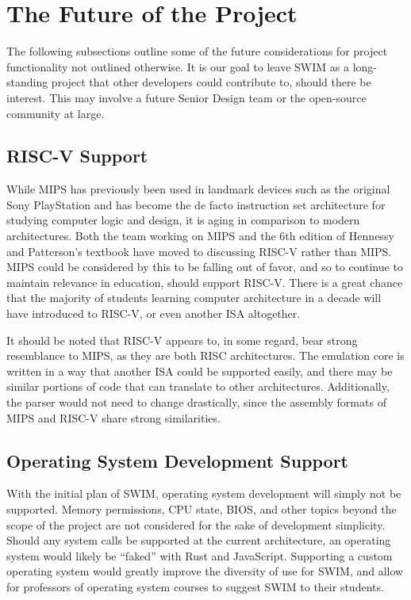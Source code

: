 \documentclass[
    paper=letter,
    parskip=half,
    fontsize=12pt,
    titlepage=firstiscover,
    toc=bibliography,
    numbers=endperiod
]{scrartcl}
\let\oldsection\section
\renewcommand{\section}{\newpage\oldsection}
\begin{document}
\section{The Future of the Project}

The following subsections outline some of the future considerations for
project functionality not outlined otherwise. It is our goal to leave
SWIM as a long-standing project that other developers could contribute
to, should there be interest. This may involve a future Senior Design
team or the open-source community at large.

\subsection{RISC-V Support}

While MIPS has previously been used in landmark devices such as the
original Sony PlayStation and has become the de facto instruction set
architecture for studying computer logic and design, it is aging in
comparison to modern architectures. Both the team working on MIPS and
the 6th edition of Hennessy and Patterson's textbook have moved to
discussing RISC-V rather than MIPS. MIPS could be considered by this to
be falling out of favor, and so to continue to maintain relevance in
education, should support RISC-V. There is a great chance that the
majority of students learning computer architecture in a decade will have
introduced to RISC-V, or even another ISA altogether.

It should be noted that RISC-V appears to, in some regard, bear strong
resemblance to MIPS, as they are both RISC architectures. The emulation
core is written in a way that another ISA could be supported easily, and
there may be similar portions of code that can translate to other
architectures. Additionally, the parser would not need to change
drastically, since the assembly formats of MIPS and RISC-V share
strong similarities.

\subsection{Operating System Development Support}

With the initial plan of SWIM, operating system development will simply
not be supported. Memory permissions, CPU state, BIOS, and other topics
beyond the scope of the project are not considered for the sake of
development simplicity. Should any system calls be supported at the
current architecture, an operating system would likely be ``faked'' with
Rust and JavaScript. Supporting a custom operating system would greatly
improve the diversity of use for SWIM, and allow for professors of
operating system courses to suggest SWIM to their students.
\end{document}
